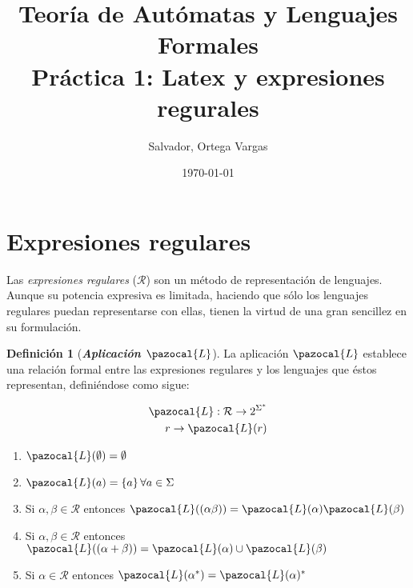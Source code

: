 \documentclass[fleqn, 10pt]{article}
\title{Teoría de Autómatas y Lenguajes Formales\\[.4\baselineskip]Práctica 1: Latex y expresiones regurales}
\author{Salvador, Ortega Vargas}
\date{\today}
\newcommand{\Lb}{\pazocal{L}}
\theoremstyle{plain}
\theoremstyle{definition}
\newtheorem{definition}{Definición}[section]
\begin{document}
\maketitle

\section{Expresiones regulares}

Las \textit{expresiones regulares} ($\mathcal{R}$) son un método de representación de
lenguajes. Aunque su potencia expresiva es limitada, haciendo que sólo los
lenguajes regulares puedan representarse con ellas, tienen la virtud de una gran
sencillez en su formulación.


\begin{definition}[\textbf{\textit{Aplicación $\Lb$}}]\label{def:aplicL}
	La aplicación $\Lb$ establece una relación formal entre las expresiones regulares y los lenguajes que éstos representan, definiéndose como sigue:
  \begin{ceqn}	%
    \begin{align*} %
    \Lb: \mathcal{R} \rightarrow 2^{\Sigma^*}\\ 
    r \rightarrow \Lb(r)
    \end{align*} 
  \end{ceqn} 
  
\begin{enumerate}[label=\alph{enumi})]
  \item $\Lb(\emptyset)=\emptyset$ 
  \item $\Lb(a)=\{a\} \, \forall a\in\Sigma$ 
  \item Si $\alpha,\beta \in \mathcal{R}$ entonces $\Lb((\alpha\beta))=\Lb(\alpha)\Lb(\beta)$
  \item Si $\alpha,\beta \in \mathcal{R}$ entonces $\Lb((\alpha+\beta))=\Lb(\alpha)\cup \Lb(\beta)$
  \item Si $\alpha \in \mathcal{R}$ entonces $\Lb(\alpha^*)=\Lb(\alpha)^*$
\end{enumerate}

\end{definition}
\end{document}
